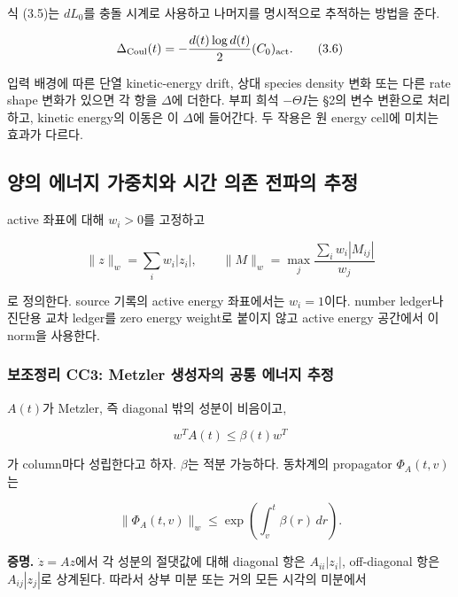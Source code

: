 식 (3.5)는 \(dL_0\)를 충돌 시계로 사용하고 나머지를 명시적으로 추적하는 방법을 준다.

\[
\Delta_{\rm Coul}(t)
=-\frac{d(t)\log d(t)}2(C_0)_{\rm act}.
\tag{3.6}
\]

입력 배경에 따른 단열 kinetic-energy drift, 상대 species density 변화 또는 다른 rate shape 변화가 있으면 각 항을 \(\Delta\)에 더한다. 부피 희석 \(-\Theta I\)는 §2의 변수 변환으로 처리하고, kinetic energy의 이동은 이 \(\Delta\)에 들어간다. 두 작용은 원 energy cell에 미치는 효과가 다르다.

\hypertarget{uxc591uxc758-uxc5d0uxb108uxc9c0-uxac00uxc911uxce58uxc640-uxc2dcuxac04-uxc758uxc874-uxc804uxd30cuxc758-uxcd94uxc815}{%
\subsection{양의 에너지 가중치와 시간 의존 전파의 추정}\label{uxc591uxc758-uxc5d0uxb108uxc9c0-uxac00uxc911uxce58uxc640-uxc2dcuxac04-uxc758uxc874-uxc804uxd30cuxc758-uxcd94uxc815}}

active 좌표에 대해 \(w_i>0\)를 고정하고

\[
\|z\|_w=\sum_iw_i|z_i|,\qquad
\|M\|_w=\max_j\frac{\sum_iw_i|M_{ij}|}{w_j}
\tag{4.1}
\]

로 정의한다. source 기록의 active energy 좌표에서는 \(w_i=1\)이다. number ledger나 진단용 교차 ledger를 zero energy weight로 붙이지 않고 active energy 공간에서 이 norm을 사용한다.

\hypertarget{uxbcf4uxc870uxc815uxb9ac-cc3-metzler-uxc0dduxc131uxc790uxc758-uxacf5uxd1b5-uxc5d0uxb108uxc9c0-uxcd94uxc815}{%
\subsubsection{보조정리 CC3: Metzler 생성자의 공통 에너지 추정}\label{uxbcf4uxc870uxc815uxb9ac-cc3-metzler-uxc0dduxc131uxc790uxc758-uxacf5uxd1b5-uxc5d0uxb108uxc9c0-uxcd94uxc815}}

\(A(t)\)가 Metzler, 즉 diagonal 밖의 성분이 비음이고,

\[
w^TA(t)\le\beta(t)w^T
\tag{4.2}
\]

가 column마다 성립한다고 하자. \(\beta\)는 적분 가능하다. 동차계의 propagator \(\Phi_A(t,v)\)는

\[
\boxed{
\|\Phi_A(t,v)\|_w
\le\exp\!\left(\int_v^t\beta(r)\,dr\right).
}
\tag{4.3}
\]

\textbf{증명.} \(\dot z=A z\)에서 각 성분의 절댓값에 대해 diagonal 항은 \(A_{ii}|z_i|\), off-diagonal 항은 \(A_{ij}|z_j|\)로 상계된다. 따라서 상부 미분 또는 거의 모든 시각의 미분에서

